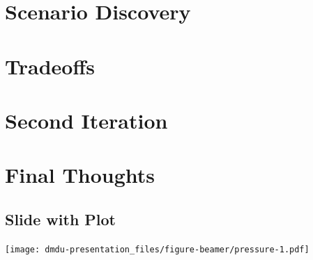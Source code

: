 \documentclass[ignorenonframetext,]{beamer}
\begin{document}
\section{Scenario Discovery}\label{scenario-discovery}

\section{Tradeoffs}\label{tradeoffs}

\section{Second Iteration}\label{second-iteration}

\section{Final Thoughts}\label{final-thoughts}

\subsection{Slide with Plot}\label{slide-with-plot}

\texttt{[image: dmdu-presentation\_files/figure-beamer/pressure-1.pdf]}
\end{document}

